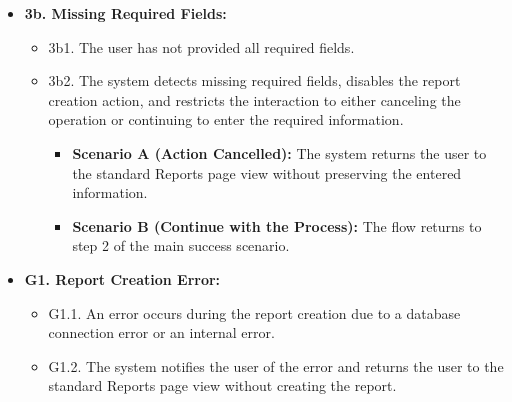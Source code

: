 \begin{itemize} [label={}, leftmargin=0.75cm, noitemsep]
    \item \textbf{3b. Missing Required Fields:}
    \begin{itemize} [label={}, leftmargin=0.75cm, noitemsep]
        \item 3b1. The user has not provided all required fields.
        \item 3b2. The system detects missing required fields, disables the report creation action, and restricts the interaction to either canceling the operation or continuing to enter the required information.
        \begin{itemize} [label={}, leftmargin=0.75cm, noitemsep]
            \item \textbf{Scenario A (Action Cancelled):} The system returns the user to the standard Reports page view without preserving the entered information.
            \item \textbf{Scenario B (Continue with the Process):} The flow returns to step 2 of the main success scenario.
        \end{itemize}
    \end{itemize}

    \item \textbf{G1. Report Creation Error:}
    \begin{itemize} [label={}, leftmargin=0.75cm, noitemsep]
        \item G1.1. An error occurs during the report creation due to a database connection error or an internal error.
        \item G1.2. The system notifies the user of the error and returns the user to the standard Reports page view without creating the report.
    \end{itemize}

\end{itemize}

\vspace{0.3cm}
